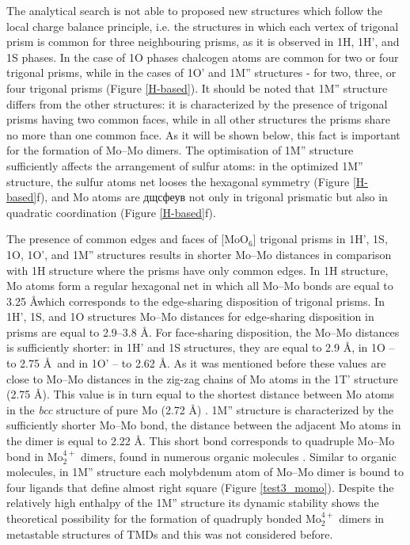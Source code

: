 \documentclass[a4paperm]{article}
\begin{document}
The analytical search is not able to proposed new structures which follow the local charge balance principle, i.e. the structures in which each vertex of trigonal prism is common for three neighbouring prisms, as it is observed in 1H, 1H', and 1S phases. In the case of 1O phases chalcogen atoms are common for two or four trigonal prisms, while in the cases of 1O' and 1M'' structures - for two, three, or four trigonal prisms (Figure \ref{H-based}). It should be noted that 1M'' structure differs from the other structures: it is characterized by the presence of trigonal prisms having two common faces, while in all other structures the prisms share no more than one common face.
As it will be shown below, this fact is important for the formation of Mo--Mo dimers.
The optimisation of 1M'' structure sufficiently affects the arrangement of sulfur atoms: in the optimized 1M'' structure, the sulfur atoms net looses the hexagonal symmetry (Figure \ref{H-based}f), and Mo atoms are дщсфеув not only in trigonal prismatic but also in quadratic coordination (Figure \ref{H-based}f).


The presence of common edges and faces of [MoO$_6$] trigonal prisms in 1H', 1S, 1O, 1O', and 1M'' structures results in shorter Mo--Mo distances in comparison with 1H structure where the prisms have only common edges.
In 1H structure, Mo atoms form a regular hexagonal net in which all Mo--Mo bonds are equal to 3.25 \AA which corresponds to the edge-sharing disposition of trigonal prisms.
In 1H', 1S, and 1O structures Mo--Mo distances for edge-sharing disposition in prisms are equal to 2.9--3.8 \AA.
For face-sharing disposition, the Mo--Mo distances is sufficiently shorter: in 1H' and 1S structures, they are equal to 2.9 \AA, in 1O -- to 2.75 \AA\ and in 1O' -- to 2.62 \AA.
As it was mentioned before these values are close to Mo--Mo distances in the zig-zag chains of Mo atoms in the 1T' structure (2.75 \AA).
This value is in turn equal to the shortest distance between Mo atoms in the {\it bcc} structure of pure Mo (2.72 \AA) \cite{MoV}.
1M'' structure is characterized by the sufficiently shorter Mo--Mo bond, the distance between the adjacent Mo atoms in the dimer is equal to 2.22 \AA.
This short bond corresponds to quadruple Mo--Mo bond in Mo$_2^{4+}$ dimers, found in numerous organic molecules \cite{momo}.
Similar to organic molecules, in 1M'' structure  each molybdenum atom of Mo--Mo dimer is bound to four ligands that define almost right square (Figure \ref{test3_momo}).
Despite the relatively high enthalpy of the 1M'' structure its dynamic stability shows the theoretical possibility for the formation of quadruply bonded Mo$_2^{4+}$ dimers in metastable structures of TMDs and this was not considered before.
\end{document}
